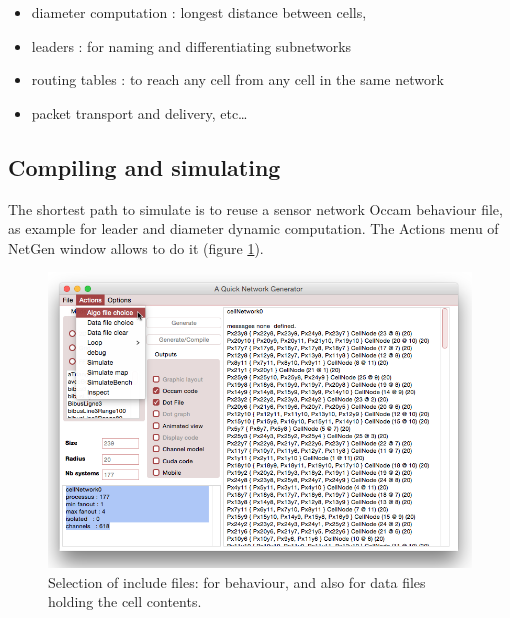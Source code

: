 \begin{itemize}
\item diameter computation : longest distance between cells,
\item leaders : for naming and differentiating subnetworks
\item routing tables : to reach any cell from any cell in the same network
\item packet transport and delivery, etc\ldots
\end{itemize}

\subsection {Compiling and simulating }

The shortest path to simulate is to reuse a sensor network Occam behaviour file,
as example for leader and diameter dynamic computation. The Actions menu
of NetGen window allows to do it (figure \ref{fig:NetGenAlgo}).

\begin{figure}[hbtp]
\begin{center} 
\includegraphics[width=12cm]{NetGenAlgoFile.png}
\caption{Selection of include files: for  behaviour, and also for data files holding the cell contents.}
\label{fig:NetGenAlgo}
\end{center}
\end{figure}






































